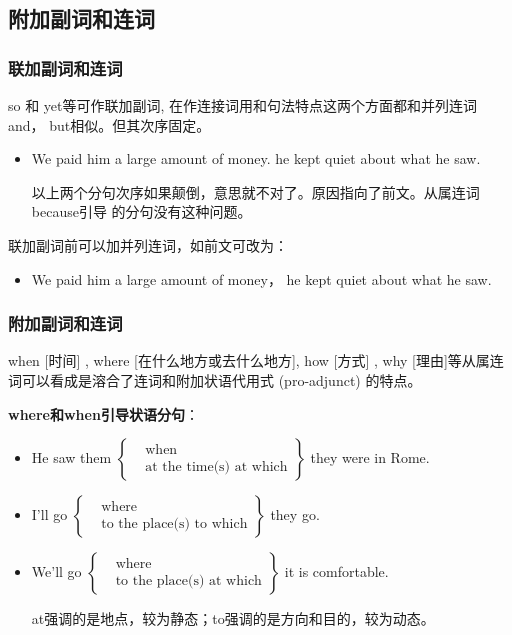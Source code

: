 \subsection{附加副词和连词}
\subsubsection{联加副词和连词}

so 和 yet等可作联加副词, 在作连接词用和句法特点这两个方面都和并列连词and，
but相似。但其次序固定。

\begin{itemize}
\item We paid him a large amount of money.  he kept quiet about what he saw.

  以上两个分句次序如果颠倒，意思就不对了。原因指向了前文。从属连词because引导
  的分句没有这种问题。
\end{itemize}

联加副词前可以加并列连词，如前文可改为：
\begin{itemize}
\item We paid him a large amount of money，  he kept quiet about what he saw.
\end{itemize}

\subsubsection{附加副词和连词}

when [时间] , where [在什么地方或去什么地方], how [方式] , why [理由]等从属连
词可以看成是溶合了连词和附加状语代用式 (pro-adjunct) 的特点。

\textbf{where和when引导状语分句}：
\begin{itemize}
\item He saw them
    $\left\{
      \begin{aligned}
        &\text{when}\\
        &\text{at the time(s) at which}
      \end{aligned}
      \right\} $ they were in Rome.

\item I'll go
    $\left\{
      \begin{aligned}
        &\text{where}\\
        &\text{to the place(s) to which}
      \end{aligned}
      \right\} $ they go.

\item We'll go
    $\left\{
      \begin{aligned}
        &\text{where}\\
        &\text{to the place(s) at which}
      \end{aligned}
      \right\} $ it is comfortable.

      at强调的是地点，较为静态；to强调的是方向和目的，较为动态。
\end{itemize}

